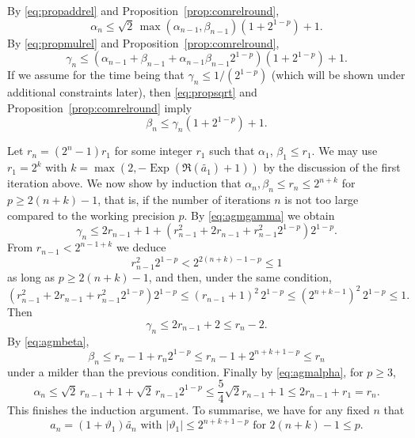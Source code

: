 \documentclass [11pt]{article}
\newcommand {\corr}[1]{{#1}}
\newcommand {\appro}[1]{\widetilde {#1}}
\DeclareMathOperator{\Exp}{\operatorname {Exp}}
\renewcommand {\theta}{\vartheta}
\renewcommand {\leq}{\leqslant}
\renewcommand {\geq}{\geqslant}
\begin{document}
By \eqref {eq:propaddrel} and Proposition~\ref {prop:comrelround},
\begin {equation}
\label {eq:agmalpha}
\alpha_n \leq
\sqrt 2 \, \max (\alpha_{n-1}, \beta_{n-1})
\left( 1 + 2^{1-p} \right) + 1.
\end {equation}
By \eqref {eq:propmulrel} and Proposition~\ref {prop:comrelround},
\begin {equation}
\label {eq:agmgamma}
\gamma_n \leq
\left( \alpha_{n-1} + \beta_{n-1} + \alpha_{n-1} \beta_{n-1} 2^{1-p} \right)
\left( 1 + 2^{1-p} \right) + 1.
\end {equation}
If we assume for the time being that $\gamma_n \leq 1 / (2^{1-p})$
(which will be shown under additional constraints later), then
\eqref {eq:propsqrt} and Proposition~\ref {prop:comrelround} imply
\begin {equation}
\label {eq:agmbeta}
\beta_n \leq
\gamma_n (1 + 2^{1-p}) + 1.
\end {equation}

Let $r_n = (2^n - 1) r_1$ for some integer $r_1$ such that
$\alpha_1$, $\beta_1 \leq r_1$.
We may use $r_1 = 2^k$ with $k = \max (2, - \Exp (\Re (\appro {a_1}) + 1))$
by the discussion of the first iteration above.
We now show by induction that
$\alpha_n, \beta_n \leq r_n \leq 2^{n + k}$ for $p \geq 2 (n + k) - 1$,
that is, if the number of iterations $n$ is not too large compared to
the working precision $p$.
By \eqref {eq:agmgamma} we obtain
\[
\gamma_n \leq
2 r_{n-1} + 1 +
\left( r_{n-1}^2 + 2 r_{n-1} + r_{n-1}^2 2^{1-p} \right) 2^{1-p}.
\]
From $r_{n-1} < 2^{n - 1 + k}$ we deduce
\[
r_{n-1}^2 2^{1-p} < 2^{2 (n + k) - 1 - p} \leq 1
\]
as long as $p \geq 2 (n + k) - 1$, and then, under the same condition,
\[
\left( r_{n-1}^2 + 2 r_{n-1} + r_{n-1}^2 2^{1-p} \right) 2^{1-p}
\leq
(r_{n-1} + 1)^2 \, 2^{1-p} \leq (2^{n+k-1})^2 \, 2^{1-p} \leq 1.
\]
Then
\[
\gamma_n
\leq
2 r_{n-1} + 2
\leq
r_n - 2.
\]
By \eqref {eq:agmbeta},
\[
\beta_n
\leq
r_n - 1 + r_n 2^{1-p}
\leq
r_n - 1 + 2^{n+k+1-p}
\leq r_n
\]
under a milder than the previous condition. Finally by \eqref {eq:agmalpha},
for $p \geq 3$,
\[
\alpha_n
\leq
\sqrt 2 \, r_{n-1} + 1 + \sqrt {2} \, r_{n-1} 2^{1-p}
\leq \frac{5}{4} \sqrt{2} r_{n-1} + 1 \leq 2 r_{n-1} + r_1 = r_n.
\]
This finishes the induction argument.
To summarise, we have for any fixed $n$ that
\begin {equation}
\label {eq:propagm}
\corr {a_n} = (1 + \theta_1) \appro {a_n}
\text { with }
|\theta_1| \leq 2^{n + k + 1 - p}
\text { for }
2 (n + k) - 1 \leq p.
\end {equation}
\end{document}
